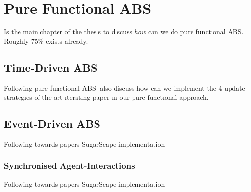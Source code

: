\chapter{Pure Functional ABS}
Is the main chapter of the thesis to discuss \textit{how} can we do pure functional ABS. Roughly 75\% exists already.

\section{Time-Driven ABS}
Following pure functional ABS, also discuss how can we implement the 4 update-strategies of the art-iterating paper in our pure functional approach.

\section{Event-Driven ABS}
Following towards papers SugarScape implementation
\subsection{Synchronised Agent-Interactions}
Following towards papers SugarScape implementation


